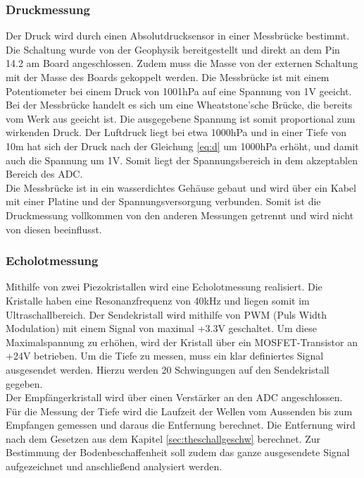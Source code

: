 \documentclass[12pt,a4paper,titlepage,headinclude,bibtotoc]{scrartcl}
\numberwithin{equation}{subsection}
\begin{document}
\subsubsection{Druckmessung}
\label{sec:durchdruck}
Der Druck wird durch einen Absolutdrucksensor in einer Messbrücke bestimmt.
Die Schaltung wurde von der Geophysik bereitgestellt und direkt an dem Pin 14.2 am Board angeschlossen.
Zudem muss die Masse von der externen Schaltung mit der Masse des Boards gekoppelt werden.
Die Messbrücke ist mit einem Potentiometer bei einem Druck von 1001hPa auf eine Spannung von 1\si{\volt} geeicht.
Bei der Messbrücke handelt es sich um  eine Wheatstone'sche Brücke, die bereits vom Werk aus geeicht ist.
Die ausgegebene Spannung ist somit proportional zum wirkenden Druck.
Der Luftdruck liegt bei etwa 1000hPa und in einer Tiefe von 10\si{\meter} hat sich der Druck nach der Gleichung \eqref{eq:d} um 1000hPa erhöht, und damit auch die Spannung um 1\si{\volt}.
Somit liegt der Spannungsbereich in dem akzeptablen Bereich des ADC.\\
Die Messbrücke ist in ein wasserdichtes Gehäuse gebaut und wird über ein Kabel mit einer Platine und der Spannungsversorgung verbunden.
Somit ist die Druckmessung vollkommen von den anderen Messungen getrennt und wird nicht von diesen beeinflusst.

\subsubsection{Echolotmessung}
Mithilfe von zwei Piezokristallen wird eine Echolotmessung realisiert.
Die Kristalle haben eine Resonanzfrequenz von 40\si{\kilo\hertz} und liegen somit im Ultraschallbereich.
Der Sendekristall wird mithilfe von PWM (Puls Width Modulation) mit einem Signal von maximal +3.3\si{\volt} geschaltet.
Um diese Maximalspannung zu erhöhen, wird der Kristall über ein MOSFET-Transistor an +24\si{\volt} betrieben.
Um die Tiefe zu messen, muss ein klar definiertes Signal ausgesendet werden.
Hierzu werden 20 Schwingungen auf den Sendekristall gegeben.\\
Der Empfängerkristall wird über einen Verstärker an den ADC angeschlossen.
Für die Messung der Tiefe wird die Laufzeit der Wellen vom Aussenden bis zum Empfangen gemessen und daraus die Entfernung berechnet.
Die Entfernung wird nach dem Gesetzen aus dem Kapitel \ref{sec:theschallgeschw} berechnet.
Zur Bestimmung der Bodenbeschaffenheit soll zudem das ganze ausgesendete Signal aufgezeichnet und anschließend analysiert werden.
\end{document}
